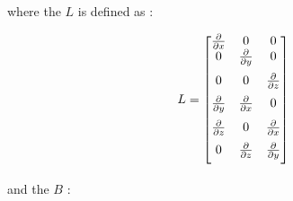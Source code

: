 where the  $L$ is defined as
:

\begin{equation}
L =
\begin{bmatrix}
\frac{\partial}{\partial x} & 0 & 0 \\
\vspace{2mm}
0 & \frac{\partial}{\partial y} & 0 \\
\vspace{2mm}
0 & 0 & \frac{\partial}{\partial z} \\
\vspace{2mm}
\frac{\partial}{\partial y} & \frac{\partial}{\partial x}  & 0 \\
\vspace{2mm}
\frac{\partial}{\partial z} & 0 & \frac{\partial}{\partial x} \\ 
\vspace{2mm}
0 & \frac{\partial}{\partial z}  & \frac{\partial}{\partial y}
\end{bmatrix}
\end{equation}

\layoutnewpage

and the  $B$
:

